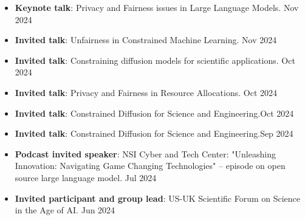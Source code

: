 
\vspace{6pt}
\begin{itemize}
  \item {\bf Keynote talk}: Privacy and Fairness issues in Large Language Models.
  \hfill {Nov 2024}\\

  \item {\bf Invited talk}: Unfairness in Constrained Machine Learning.
  \hfill {Nov 2024}\\

  \item {\bf Invited talk}: Constraining diffusion models for scientific applications.
  \hfill {Oct 2024}\\

  \item {\bf Invited talk}: Privacy and Fairness in Resource Allocations. \hfill{Oct 2024}\\

  \item {\bf Invited talk}: Constrained Diffusion for Science and Engineering.\hfill {Oct 2024}\\

  \item {\bf Invited talk}: Constrained Diffusion for Science and Engineering.\hfill {Sep 2024}\\

  \item {\bf Podcast invited speaker}: 
  NSI Cyber and Tech Center: "Unleashing Innovation: Navigating Game Changing Technologies" -- episode on open source large language model.
  \hfill{Jul 2024}\\

  \item {\bf Invited participant and group lead}: 
  {US-UK Scientific Forum on Science in the Age of AI.} \hfill{Jun 2024}\\


\end{itemize}
